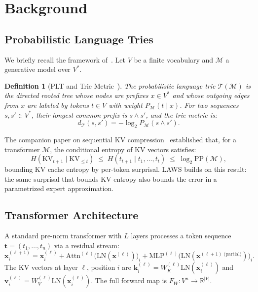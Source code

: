 \documentclass[11pt]{article}
\newtheorem{definition}{Definition}
\begin{document}
\section{Background}
\label{sec:background}

\subsection{Probabilistic Language Tries}

We briefly recall the framework of~\cite{plt2026}.  Let $V$ be a finite
vocabulary and $\mathcal{M}$ a generative model over $V^*$.

\begin{definition}[PLT and Trie Metric~\cite{plt2026}]
\label{def:plt}
The \emph{probabilistic language trie} $\mathcal{T}(\mathcal{M})$ is the
directed rooted tree whose nodes are prefixes $x \in V^*$ and whose outgoing
edges from $x$ are labeled by tokens $t \in V$ with weight
$P_{\mathcal{M}}(t \mid x)$.  For two sequences $s, s' \in V^*$, their
\emph{longest common prefix} is $s \wedge s'$, and the \emph{trie metric} is:
\[
  d_{\mathcal{T}}(s, s') = -\log_2 P_{\mathcal{M}}(s \wedge s').
\]
\end{definition}

The companion paper on sequential KV compression~\cite{kv2026} established that, for a transformer
$\mathcal{M}$, the conditional entropy of KV vectors satisfies:
\[
  H(\mathrm{KV}_{t+1} \mid \mathrm{KV}_{\leq t})
  \;\leq\;
  H(t_{t+1} \mid t_1,\ldots,t_t)
  \;\leq\;
  \log_2 \mathrm{PP}(\mathcal{M}),
\]
bounding KV cache entropy by per-token surprisal.  LAWS builds on this result:
the same surprisal that bounds KV entropy also bounds the error in a
parametrized expert approximation.

\subsection{Transformer Architecture}

A standard pre-norm transformer with $L$ layers processes a token sequence
$\mathbf{t} = (t_1,\ldots,t_n)$ via a residual stream:
\[
  \mathbf{x}^{(\ell+1)}_i
  = \mathbf{x}^{(\ell)}_i + \mathrm{Attn}^{(\ell)}\!\bigl(\mathrm{LN}(\mathbf{x}^{(\ell)})\bigr)_i
  + \mathrm{MLP}^{(\ell)}\!\bigl(\mathrm{LN}(\mathbf{x}^{(\ell+1) \text{ (partial)}})\bigr)_i.
\]
The KV vectors at layer $\ell$, position $i$ are
$\mathbf{k}^{(\ell)}_i = W_K^{(\ell)}\mathrm{LN}(\mathbf{x}^{(\ell)}_i)$ and
$\mathbf{v}^{(\ell)}_i = W_V^{(\ell)}\mathrm{LN}(\mathbf{x}^{(\ell)}_i)$.
The full forward map is $F_W: V^n \to \mathbb{R}^{|V|}$.
\end{document}
